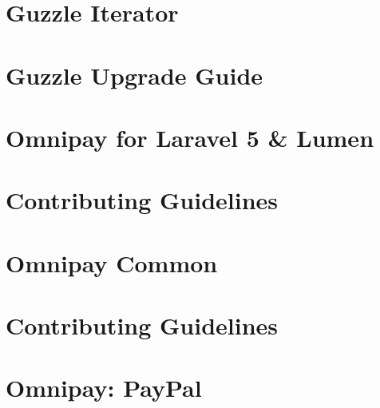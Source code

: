 \let\mypdfximage\pdfximage\def\pdfximage{\immediate\mypdfximage}\documentclass[twoside]{book}
\newcommand{\+}{\discretionary{\mbox{\scriptsize$\hookleftarrow$}}{}{}}
\begin{document}
\chapter{Guzzle Iterator}
\label{md_pixel_shop_vendor_guzzle_guzzle_src__guzzle__iterator__r_e_a_d_m_e}

\chapter{Guzzle Upgrade Guide}
\label{md_pixel_shop_vendor_guzzle_guzzle__u_p_g_r_a_d_i_n_g}

\chapter{Omnipay for Laravel 5 \& Lumen}
\label{md_pixel_shop_vendor_ignited_laravel_omnipay__r_e_a_d_m_e}

\chapter{Contributing Guidelines}
\label{md_pixel_shop_vendor_omnipay_common__c_o_n_t_r_i_b_u_t_i_n_g}

\chapter{Omnipay Common}
\label{md_pixel_shop_vendor_omnipay_common__r_e_a_d_m_e}

\chapter{Contributing Guidelines}
\label{md_pixel_shop_vendor_omnipay_paypal__c_o_n_t_r_i_b_u_t_i_n_g}

\chapter{Omnipay\+: Pay\+Pal}
\label{md_pixel_shop_vendor_omnipay_paypal__r_e_a_d_m_e}

\end{document}
